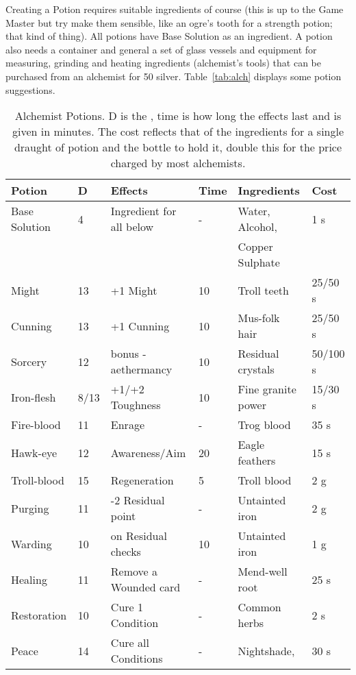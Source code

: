 \documentclass[a4paper,11pt,oneside]{book}
\newcommand{\textlf}[1]{\textbf{\titlecap{#1}}}
\begin{document}
Creating a Potion requires suitable ingredients of course (this is up to the Game Master but try make them sensible, like an ogre's tooth for a strength potion; that kind of thing). All potions have Base Solution as an ingredient. A potion also needs a container and general a set of glass vessels and equipment for measuring, grinding and heating ingredients (alchemist's tools) that can be purchased from an alchemist for 50 silver.
Table~\ref{tab:alch} displays some potion suggestions.

\begin{table}[ht!]
\caption{Alchemist Potions. D is the \textlf{difficulty}, time is how long the effects last and is given in minutes. The cost reflects that of the ingredients for a single draught of potion and the bottle to hold it, double this for the price charged by most alchemists.}
\begin{tabular}{|l|l|l|l|l|l|}
\hline
Potion & D & Effects & Time & Ingredients & Cost \\
\hline
Base Solution & 4 & Ingredient for all below & - & Water, Alcohol,  & 1 s \\
 & & & & Copper Sulphate & \\
\hline
Might &  13 & +1 Might & 10 & Troll teeth & 25/50 s \\
Cunning & 13 & +1 Cunning & 10 & Mus-folk hair & 25/50 s \\
Sorcery & 12 &\textlf{edge} bonus - aethermancy & 10 & Residual crystals & 50/100 s\\
Iron-flesh & 8/13 & +1/+2 Toughness & 10 & Fine granite power & 15/30 s \\
Fire-blood & 11 & Enrage & - & Trog blood & 35 s \\
Hawk-eye & 12 & \textlf{edge} Awareness/Aim & 20 & Eagle feathers & 15 s \\
Troll-blood & 15 & Regeneration & 5 & Troll blood & 2 g \\
Purging & 11 & -2 Residual point & - & Untainted iron & 2 g\\
Warding & 10 & \textlf{edge} on Residual checks & 10 & Untainted iron & 1 g \\ 
Healing & 11 & Remove a Wounded card & - & Mend-well root & 25 s \\
Restoration & 10 & Cure 1 Condition & - & Common herbs & 2 s \\
Peace & 14 & Cure all Conditions & - & Nightshade,  & 30 s \\

\end{tabular}
\end{table}
\end{document}
